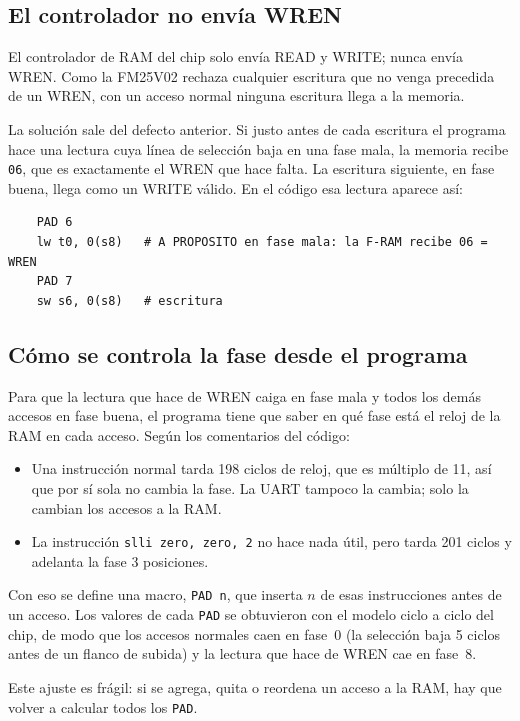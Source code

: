 \documentclass[11pt,letterpaper,oneside]{report}
\newcommand{\code}[1]{\texttt{#1}}
\begin{document}
\subsection{El controlador no envía WREN}

El controlador de RAM del chip solo envía READ y WRITE; nunca envía WREN. Como la FM25V02 rechaza cualquier escritura que no venga precedida de un WREN, con un acceso normal ninguna escritura llega a la memoria.

La solución sale del defecto anterior. Si justo antes de cada escritura el programa hace una lectura cuya línea de selección baja en una fase mala, la memoria recibe \code{06}, que es exactamente el WREN que hace falta. La escritura siguiente, en fase buena, llega como un WRITE válido. En el código esa lectura aparece así:

\begin{lstlisting}
    PAD 6
    lw t0, 0(s8)   # A PROPOSITO en fase mala: la F-RAM recibe 06 = WREN
    PAD 7
    sw s6, 0(s8)   # escritura
\end{lstlisting}

\subsection{Cómo se controla la fase desde el programa}

Para que la lectura que hace de WREN caiga en fase mala y todos los demás accesos en fase buena, el programa tiene que saber en qué fase está el reloj de la RAM en cada acceso. Según los comentarios del código:

\begin{itemize}
  \item Una instrucción normal tarda 198 ciclos de reloj, que es múltiplo de 11, así que por sí sola no cambia la fase. La UART tampoco la cambia; solo la cambian los accesos a la RAM.
  \item La instrucción \code{slli zero, zero, 2} no hace nada útil, pero tarda 201 ciclos y adelanta la fase 3 posiciones.
\end{itemize}

Con eso se define una macro, \code{PAD n}, que inserta $n$ de esas instrucciones antes de un acceso. Los valores de cada \code{PAD} se obtuvieron con el modelo ciclo a ciclo del chip, de modo que los accesos normales caen en fase~0 (la selección baja 5 ciclos antes de un flanco de subida) y la lectura que hace de WREN cae en fase~8.

Este ajuste es frágil: si se agrega, quita o reordena un acceso a la RAM, hay que volver a calcular todos los \code{PAD}.
\end{document}
